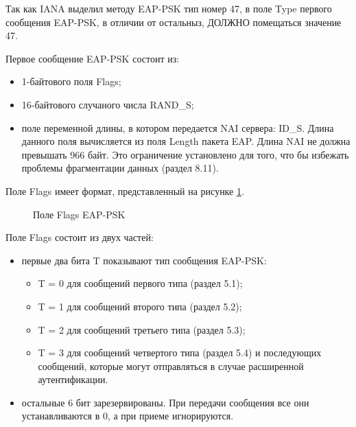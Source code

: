 Так как IANA выделил методу EAP-PSK тип номер 47, в поле Type первого сообщения EAP-PSK, в отличии от остальныз, ДОЛЖНО помещаться значение 47.

Первое сообщение EAP-PSK состоит из:

\begin{itemize}
\item 1-байтового поля Flags;
\item 16-байтового случаного числа RAND\_S;
\item поле переменной длины, в котором передается NAI сервера: ID\_S. Длина данного поля вычисляется из поля Length пакета EAP. Длина NAI не должна превышать 966 байт. Это ограничение установлено для того, что бы избежать проблемы фрагментации данных (раздел 8.11).
\end{itemize}

Поле Flags имеет формат, представленный на рисунке \ref{img:flags_field}.

\begin{figure}[h!]
\caption{Поле Flags EAP-PSK}
\label{img:flags_field}
\end{figure}

Поле Flags состоит из двух частей:

\begin{itemize}
\item первые два бита T показывают тип сообщения EAP-PSK:
\begin{itemize}
\item T = 0 для сообщений первого типа (раздел 5.1);
\item T = 1 для сообщений второго типа (раздел 5.2);
\item T = 2 для сообщений третьего типа (раздел 5.3);
\item T = 3 для сообщений четвертого типа (раздел 5.4) и последующих сообщений, которые могут отправляться в случае расширенной аутентификации.
\end{itemize}
\item остальные 6 бит зарезервированы. При передачи сообщения все они устанавливаются в 0, а при приеме игнорируются.
\end{itemize}

